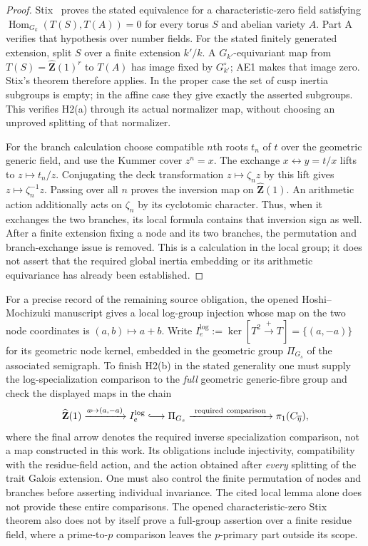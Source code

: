 \documentclass[11pt,a4paper]{article}
\begin{document}
\begin{proof}
Stix~\cite[Theorem 20 and \S5.2]{B_Stix2008} proves the stated
equivalence for a characteristic-zero field satisfying
$\operatorname{Hom}_{G_k}(T(S),T(A))=0$ for every torus $S$ and
abelian variety $A$. Part A verifies that hypothesis over number
fields. For the stated finitely generated extension, split $S$ over a
finite extension $k'/k$. A $G_{k'}$-equivariant map from
$T(S)=\widehat{\mathbf Z}(1)^r$ to $T(A)$ has image fixed by
$G_{k'}^\circ$; AE1 makes that image zero. Stix's theorem therefore
applies. In the proper case the set of cusp inertia subgroups is
empty; in the affine case they give exactly the asserted subgroups.
This verifies H2(a) through its actual normalizer map, without choosing
an unproved splitting of that normalizer.

For the branch calculation choose compatible $n$th roots $t_n$ of
$t$ over the geometric generic field, and use the Kummer cover
$z^n=x$. The exchange $x\leftrightarrow y=t/x$ lifts to
$z\mapsto t_n/z$. Conjugating the deck transformation
$z\mapsto\zeta_n z$ by this lift gives
$z\mapsto\zeta_n^{-1}z$. Passing over all $n$ proves the inversion
map on $\widehat{\mathbf Z}(1)$. An arithmetic action additionally
acts on $\zeta_n$ by its cyclotomic character. Thus, when it exchanges
the two branches, its local formula contains that inversion sign as
well. After a finite extension fixing a node and its two branches,
the permutation and branch-exchange issue is removed. This is a
calculation in the local group; it does not assert that the required
global inertia embedding or its arithmetic equivariance has already
been established.
\end{proof}

For a precise record of the remaining source obligation, the opened
Hoshi--Mochizuki manuscript
\cite[Definition 2.10(iv) and Lemma 2.11(ii),(iii)]{B_HoshiMochizuki2011}
gives a local log-group injection whose map on the two node coordinates
is $(a,b)\mapsto a+b$. Write
$I_e^{\log}:=\ker[T^2\xrightarrow{+}T]=\{(a,-a)\}$ for its
geometric node kernel, embedded in the geometric group $\Pi_{G_s}$ of
the associated semigraph. To finish H2(b) in the stated generality one must
supply the log-specialization comparison to the \emph{full} geometric
generic-fibre group and check the displayed maps in the chain
\[
 \widehat{\mathbf Z}(1)
 \xrightarrow{a\mapsto(a,-a)} I_e^{\log}
 \lhook\joinrel\longrightarrow\Pi_{G_s}
 \xrightarrow{\ \mathrm{required\ comparison}\ }
 \pi_1(C_{\overline\eta}),
\]
where the final arrow denotes the required inverse specialization
comparison, not a map constructed in this work. Its obligations include
injectivity, compatibility with the residue-field action,
and the action obtained after \emph{every} splitting of the trait
Galois extension. One must also control the finite permutation of nodes
and branches before asserting individual invariance. The cited local
lemma alone does not provide these entire comparisons. The opened
characteristic-zero Stix theorem also does not by itself prove a
full-group assertion over a finite residue field, where a prime-to-$p$
comparison leaves the $p$-primary part outside its scope.
\end{document}

